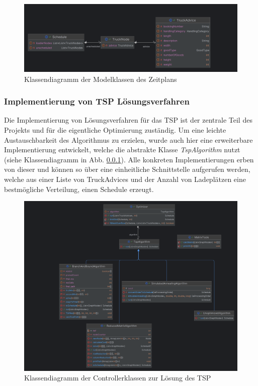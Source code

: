 \begin{figure}[H]
    \centering
    \includegraphics[width=\textwidth]{images/classDiagrams/TSP_Schedule_ClassDiagram.png}
    \caption{Klassendiagramm der Modelklassen des Zeitplans}
    \label{fig:tspClassDiagramSchedule}
\end{figure}


\subsubsection{Implementierung von TSP Lösungsverfahren}

Die Implementierung von Lösungsverfahren für das TSP ist der zentrale Teil des Projekts und für die eigentliche Optimierung zuständig. Um eine leichte Austauschbarkeit des Algorithmus zu erzielen, wurde auch hier eine erweiterbare Implementierung entwickelt, welche die abstrakte Klasse \textit{TspAlgorithm} nutzt (siehe Klassendiagramm in Abb. \ref{}). Alle konkreten Implementierungen erben von dieser und können so über eine einheitliche Schnittstelle aufgerufen werden, welche aus einer Liste von TruckAdvices und der Anzahl von Ladeplätzen eine bestmögliche Verteilung, einen Schedule erzeugt.

\begin{figure}[H]
    \centering
    \includegraphics[width=\textwidth]{images/classDiagrams/TSP_Optimizer_ClassDiagram.png}
    \caption{Klassendiagramm der Controllerklassen zur Lösung des TSP}
    \label{fig:tspClassDiagramOptimizer}
\end{figure}

